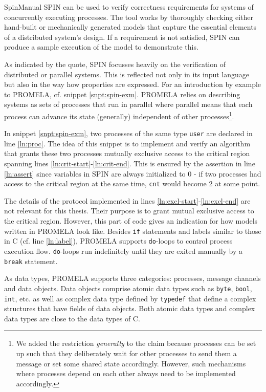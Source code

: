 \begin{displaycquote}[p.1]{SpinManual}
    SPIN can be used to verify correctness requirements for systems of concurrently executing processes.
    The tool works by thoroughly checking either hand-built or mechanically generated models that capture the essential elements of a distributed system's design.
    If a requirement is not satisfied, SPIN can produce a sample execution of the model to demonstrate this.
\end{displaycquote}

As indicated by the quote, SPIN focusses heavily on the verification of distributed or parallel systems.
This is reflected not only in its input language but also in the way how properties are expressed.
For an introduction by example to PROMELA, cf. snippet \ref{snpt:spin-exm}.
PROMELA relies on describing systems as sets of processes that run in parallel where parallel means that each process can advance its state (generally) independent of other processes\footnote{%
    We added the restriction \textit{generally} to the claim because processes can be set up such that they deliberately wait for other processes to send them a message or set some shared state accordingly.
    However, such mechanisms where processes depend on each other always need to be implemented accordingly.
}.

In snippet \ref{snpt:spin-exm}, two processes of the same type \lstinline{user} are declared in line \ref{ln:proc}.
The idea of this snippet is to implement and verify an algorithm that grants these two processes mutually exclusive access to the critical region spanning lines \ref{ln:crit-start}-\ref{ln:crit-end}.
This is ensured by the assertion in line \ref{ln:assert} since variables in SPIN are always initialized to 0 - if two processes had access to the critical region at the same time, \lstinline{cnt} would become 2 at some point.

The details of the protocol implemented in lines \ref{ln:excl-start}-\ref{ln:excl-end} are not relevant for this thesis.
Their purpose is to grant mutual exclusive access to the critical region.
However, this part of code gives an indication for how models written in PROMELA look like.
Besides \lstinline{if} statements and labels similar to those in C (cf. line \ref{ln:label}), PROMELA supports \lstinline{do}-loops to control process execution flow.
\lstinline{do}-loops run indefinitely until they are exited manually by a \lstinline{break} statement.

As data types, PROMELA supports three categories: processes, message channels and data objects.
Data objects comprise atomic data types such as \lstinline{byte}, \lstinline{bool}, \lstinline{int}, etc. as well as complex data type defined by \lstinline{typedef} that define a complex structures that have fields of data objects.
Both atomic data types and complex data types are close to the data types of C.

